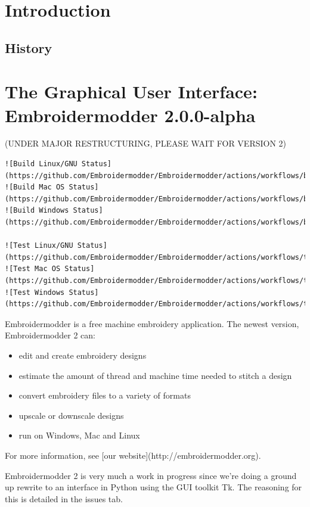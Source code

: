 \documentclass[a4paper, 11pt]{report}
\newcommand{\emversion}{2.0.0-alpha}
\begin{document}
\chapter{Introduction}

\section{History}

\chapter{The Graphical User Interface: Embroidermodder \emversion}

(UNDER MAJOR RESTRUCTURING, PLEASE WAIT FOR VERSION 2)

\begin{verbatim}
![Build Linux/GNU Status](https://github.com/Embroidermodder/Embroidermodder/actions/workflows/build_linux_gnu.yml/badge.svg)
![Build Mac OS Status](https://github.com/Embroidermodder/Embroidermodder/actions/workflows/build_macos.yml/badge.svg)
![Build Windows Status](https://github.com/Embroidermodder/Embroidermodder/actions/workflows/build_windows.yml/badge.svg)

![Test Linux/GNU Status](https://github.com/Embroidermodder/Embroidermodder/actions/workflows/test_linux_gnu.yml/badge.svg)
![Test Mac OS Status](https://github.com/Embroidermodder/Embroidermodder/actions/workflows/test_macos.yml/badge.svg)
![Test Windows Status](https://github.com/Embroidermodder/Embroidermodder/actions/workflows/test_windows.yml/badge.svg)
\end{verbatim}

Embroidermodder is a free machine embroidery application.
The newest version, Embroidermodder 2 can:

\begin{itemize}
\item edit and create embroidery designs
\item estimate the amount of thread and machine time needed to stitch a design
\item convert embroidery files to a variety of formats
\item upscale or downscale designs
\item run on Windows, Mac and Linux
\end{itemize}

For more information, see [our website](http://embroidermodder.org).

Embroidermodder 2 is very much a work in progress since we're doing a ground
up rewrite to an interface in Python using the GUI toolkit Tk.
The reasoning for this is detailed in the issues tab.
\end{document}
